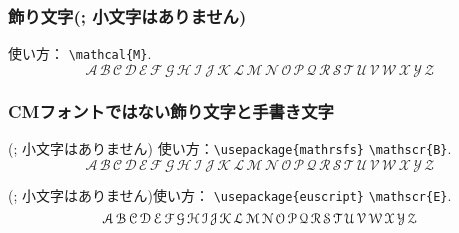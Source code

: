 
\subsubsection{飾り文字(; 小文字はありません)} 
使い方：
\verb'\mathcal{M}'.
\[
\mathcal{A}\,\mathcal{B}\,\mathcal{C}\,\mathcal{D}\,\mathcal{E}
\,\mathcal{F}\,\mathcal{G}\,\mathcal{H}\,\mathcal{I}\,\mathcal{J}
\,\mathcal{K}\,\mathcal{L}\,\mathcal{M}\,\mathcal{N}\,\mathcal{O}
\,\mathcal{P}\,\mathcal{Q}\,\mathcal{R}\,\mathcal{S}\,\mathcal{T}
\,\mathcal{U}\,\mathcal{V}\,\mathcal{W}\,\mathcal{X}\,\mathcal{Y}
\,\mathcal{Z}
\]

\subsubsection{CMフォントではない飾り文字と手書き文字}
(; 小文字はありません) 使い方：\verb'\usepackage{mathrsfs}' \verb'\mathscr{B}'.
\[
\mathscr{A}\,\mathscr{B}\,\mathscr{C}\,\mathscr{D}\,\mathscr{E}
\,\mathscr{F}\,\mathscr{G}\,\mathscr{H}\,\mathscr{I}\,\mathscr{J}
\,\mathscr{K}\,\mathscr{L}\,\mathscr{M}\,\mathscr{N}\,\mathscr{O}
\,\mathscr{P}\,\mathscr{Q}\,\mathscr{R}\,\mathscr{S}\,\mathscr{T}
\,\mathscr{U}\,\mathscr{V}\,\mathscr{W}\,\mathscr{X}\,\mathscr{Y}
\,\mathscr{Z}
\]

\begingroup
\noindent
(; 小文字はありません)使い方： \verb'\usepackage{euscript}' \verb'\mathscr{E}'.
\renewcommand{\mathscr}{\EuScript}
\[
\mathscr{A}\,\mathscr{B}\,\mathscr{C}\,\mathscr{D}\,\mathscr{E}
\,\mathscr{F}\,\mathscr{G}\,\mathscr{H}\,\mathscr{I}\,\mathscr{J}
\,\mathscr{K}\,\mathscr{L}\,\mathscr{M}\,\mathscr{N}\,\mathscr{O}
\,\mathscr{P}\,\mathscr{Q}\,\mathscr{R}\,\mathscr{S}\,\mathscr{T}
\,\mathscr{U}\,\mathscr{V}\,\mathscr{W}\,\mathscr{X}\,\mathscr{Y}
\,\mathscr{Z}
\]
\endgroup

